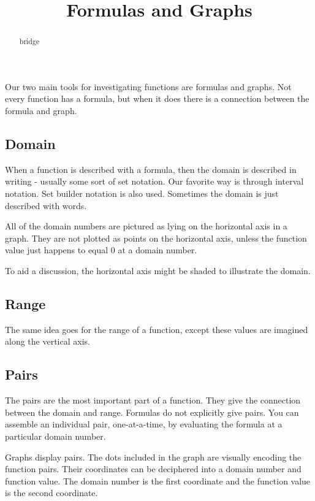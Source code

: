 \documentclass{ximera}
\title{Formulas and Graphs}
\begin{document}
\begin{abstract}
bridge
\end{abstract}
\maketitle



Our two main tools for investigating functions are formulas and graphs. Not every function has a formula, but when it does there is a connection between the formula and graph.

\subsection*{Domain}
When a function is described with a formula, then the domain is described in writing - usually some sort of set notation.  Our favorite way is through interval notation.  Set builder notation is also used.  Sometimes the domain is just described with words.

All of the domain numbers are pictured as lying on the horizontal axis in a graph.  They are not plotted as points on the horizontal axis, unless the function value just happens to equal $0$ at a domain number.

To aid a discussion, the horizontal axis might be shaded to illustrate the domain.







\subsection*{Range}
The same idea goes for the range of a function, except these values are imagined along the vertical axis.








\subsection*{Pairs}
The pairs are the most important part of a function.  They give the connection between the domain and range.  Formulas do not explicitly give pairs. You can assemble an individual pair, one-at-a-time, by evaluating the formula at a particular domain number.

Graphs display pairs.  The dots included in the graph are visually encoding the function pairs.  Their coordinates can be deciphered into a domain number and function value. The domain number is the first coordinate and the function value is the second coordinate.
\end{document}
